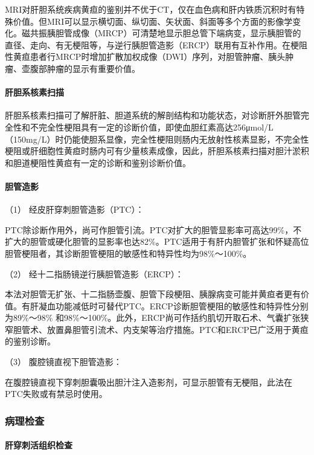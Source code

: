 MRI对肝胆系统疾病黄疸的鉴别并不优于CT，仅在血色病和肝内铁质沉积时有特殊价值。但MRI可以显示横切面、纵切面、矢状面、斜面等多个方面的影像学变化。磁共振胰胆管成像（MRCP）可清楚地显示胆总管下端病变，显示胰胆管的直径、走向、有无梗阻等，与逆行胰胆管造影（ERCP）联用有互补作用。在梗阻性黄疸患者行MRCP时增加扩散加权成像（DWI）序列，对胆管肿瘤、胰头肿瘤、壶腹部肿瘤的显示有重要价值。

\paragraph{肝胆系核素扫描}

肝胆系核素扫描可了解肝脏、胆道系统的解剖结构和功能状态，对诊断肝外胆管完全性和不完全性梗阻具有一定的诊断价值，即使血胆红素高达256μmol/L（150mg/L）时仍能使胆系显像，完全性梗阻则肠内无放射性核素显影，不完全性梗阻或肝细胞性黄疸时肠内可有少量核素成像，因此，肝胆系核素扫描对胆汁淤积和胆道梗阻性黄疸有一定的诊断和鉴别诊断价值。

\paragraph{胆管造影}

\hypertarget{text00039.htmlux5cux23CHP1-16-3-6-5-1}{}
（1） 经皮肝穿刺胆管造影（PTC）：

PTC除诊断作用外，尚可作胆管引流。PTC对扩大的胆管显影率可高达99\%，不扩大的胆管或硬化胆管的显影率也达82\%。PTC适用于有肝内胆管扩张和怀疑高位胆管梗阻者，其诊断胆管梗阻的敏感性和特异性均为98\%～100\%。

\hypertarget{text00039.htmlux5cux23CHP1-16-3-6-5-2}{}
（2） 经十二指肠镜逆行胰胆管造影（ERCP）：

本法对胆管无扩张、十二指肠壶腹、胆管下段梗阻、胰腺病变可能并黄疸者更有价值。有肝凝血功能减低时可替代PTC。ERCP诊断胆管梗阻的敏感性和特异性分别为89\%～98\%
和98\%～100\%。此外，ERCP尚可作括约肌切开取石术、气囊扩张狭窄胆管术、放置鼻胆管引流术、内支架等治疗措施。PTC和ERCP已广泛用于黄疸的鉴别诊断。

\hypertarget{text00039.htmlux5cux23CHP1-16-3-6-5-3}{}
（3） 腹腔镜直视下胆管造影：

在腹腔镜直视下穿刺胆囊吸出胆汁注入造影剂，可显示胆管有无梗阻，此法在PTC失败或有禁忌时使用。

\subsubsection{病理检查}

\paragraph{肝穿刺活组织检查}

